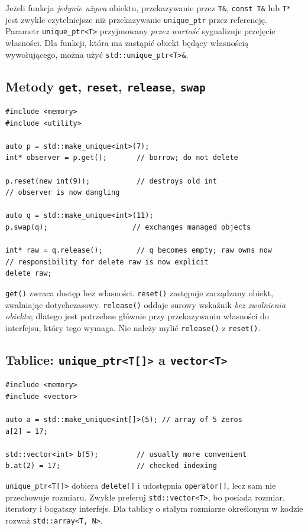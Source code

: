 Jeżeli funkcja \emph{jedynie używa} obiektu, przekazywanie przez
\texttt{T\&}, \texttt{const T\&} lub \texttt{T*} jest zwykle
czytelniejsze niż przekazywanie \texttt{unique\_ptr} przez referencję.
Parametr \texttt{unique\_ptr<T>} przyjmowany \emph{przez wartość}
sygnalizuje przejęcie własności. Dla funkcji, która ma zastąpić
obiekt będący własnością wywołującego, można użyć
\texttt{std::unique\_ptr<T>\&}.

\subsection{Metody \texttt{get}, \texttt{reset}, \texttt{release}, \texttt{swap}}

\begin{lstlisting}
#include <memory>
#include <utility>

auto p = std::make_unique<int>(7);
int* observer = p.get();       // borrow; do not delete

p.reset(new int(9));           // destroys old int
// observer is now dangling

auto q = std::make_unique<int>(11);
p.swap(q);                    // exchanges managed objects

int* raw = q.release();        // q becomes empty; raw owns now
// responsibility for delete raw is now explicit
delete raw;
\end{lstlisting}

\texttt{get()} zwraca dostęp bez własności. \texttt{reset()} zastępuje
zarządzany obiekt, zwalniając dotychczasowy. \texttt{release()} oddaje
surowy wskaźnik \emph{bez zwolnienia obiektu}; dlatego jest potrzebne
głównie przy przekazywaniu własności do interfejsu, który tego wymaga.
Nie należy mylić \texttt{release()} z \texttt{reset()}.

\subsection{Tablice: \texttt{unique\_ptr<T[]>} a \texttt{vector<T>}}

\begin{lstlisting}
#include <memory>
#include <vector>

auto a = std::make_unique<int[]>(5); // array of 5 zeros
a[2] = 17;

std::vector<int> b(5);         // usually more convenient
b.at(2) = 17;                  // checked indexing
\end{lstlisting}

\texttt{unique\_ptr<T[]>} dobiera \texttt{delete[]} i udostępnia
\texttt{operator[]}, lecz sam nie przechowuje rozmiaru.
Zwykle preferuj \texttt{std::vector<T>}, bo posiada rozmiar,
iteratory i bogatszy interfejs. Dla tablicy o stałym rozmiarze
określonym w kodzie rozważ \texttt{std::array<T, N>}.

